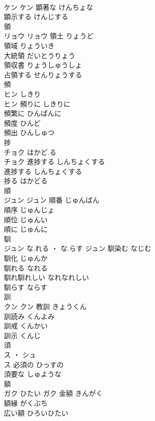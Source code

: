 \documentclass[8pt]{extreport}
\begin{document}
\begin{CJK}{UTF8}{min}
\\	ケン		ケン	顕著な	けんちょな	
\\	顕示する	けんじする	
\\	領	
\\	リョウ		リョウ	領土	りょうど	
\\	領域	りょういき	
\\	大統領	だいとうりょう	
\\	領収書	りょうしゅうしょ	
\\	占領する	せんりょうする	
\\	頻	
\\	ヒン	しきり
\\	ヒン	頻りに	しきりに	
\\	頻繁に	ひんぱんに	
\\	頻度	ひんど	
\\	頻出	ひんしゅつ	
\\	捗	
\\	チョク	はかど.る
\\	チョク	進捗する	しんちょくする	
\\	進捗する	しんちょくする	
\\	捗る	はかどる	
\\	順	
\\	ジュン		ジュン	順番	じゅんばん	
\\	順序	じゅんじょ	
\\	順位	じゅんい	
\\	順に	じゅんに	
\\	馴	
\\	ジュン	な.れる ・ な.らす	ジュン	馴染む	なじむ	
\\	馴化	じゅんか	
\\	馴れる	なれる	
\\	馴れ馴れしい	なれなれしい	
\\	馴らす	ならす	
\\	訓	
\\	クン		クン	教訓	きょうくん	
\\	訓読み	くんよみ	
\\	訓戒	くんかい	
\\	訓示	くんじ	
\\	須	
\\	ス ・ シュ
\\	ス	必須の	ひっすの	
\\	須要な	しゅような	
\\	額	
\\	ガク	ひたい	ガク	金額	きんがく	
\\	額縁	がくぶち	
\\	広い額	ひろいひたい	

\end{CJK}
\end{document}
